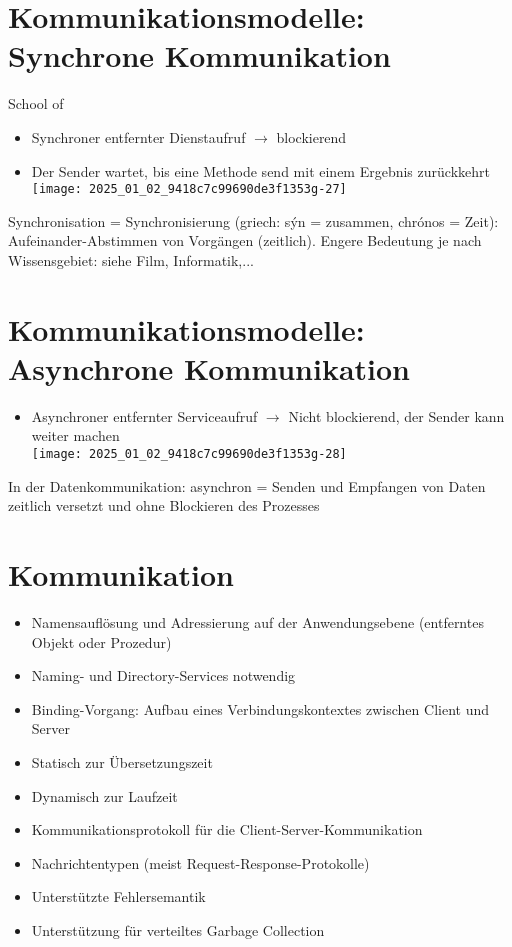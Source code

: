 \documentclass[10pt]{article}
\begin{document}
\section*{Kommunikationsmodelle: Synchrone Kommunikation}
School of

\begin{itemize}
  \item Synchroner entfernter Dienstaufruf $\rightarrow$ blockierend
  \item Der Sender wartet, bis eine Methode send mit einem Ergebnis zurückkehrt\\
\texttt{[image: 2025\_01\_02\_9418c7c99690de3f1353g-27]}
\end{itemize}

Synchronisation = Synchronisierung (griech: sýn = zusammen, chrónos = Zeit): Aufeinander-Abstimmen von Vorgängen (zeitlich). Engere Bedeutung je nach Wissensgebiet: siehe Film, Informatik,...

\section*{Kommunikationsmodelle: \\
 Asynchrone Kommunikation}
\begin{itemize}
  \item Asynchroner entfernter Serviceaufruf $\rightarrow$ Nicht blockierend, der Sender kann weiter machen\\
\texttt{[image: 2025\_01\_02\_9418c7c99690de3f1353g-28]}
\end{itemize}

In der Datenkommunikation: asynchron = Senden und Empfangen von Daten zeitlich versetzt und ohne Blockieren des Prozesses

\section*{Kommunikation}
\begin{itemize}
  \item Namensauflösung und Adressierung auf der Anwendungsebene (entferntes Objekt oder Prozedur)
  \item Naming- und Directory-Services notwendig
  \item Binding-Vorgang: Aufbau eines Verbindungskontextes zwischen Client und Server
  \item Statisch zur Übersetzungszeit
  \item Dynamisch zur Laufzeit
  \item Kommunikationsprotokoll für die Client-Server-Kommunikation
  \item Nachrichtentypen (meist Request-Response-Protokolle)
  \item Unterstützte Fehlersemantik
  \item Unterstützung für verteiltes Garbage Collection
\end{itemize}
\end{document}
